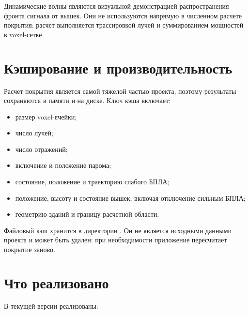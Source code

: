 \documentclass[12pt,a4paper]{article}
\begin{document}
Динамические волны являются визуальной демонстрацией распространения фронта сигнала от вышек. Они не используются напрямую в численном расчете покрытия: расчет выполняется трассировкой лучей и суммированием мощностей в voxel-сетке.

\section{Кэширование и производительность}

Расчет покрытия является самой тяжелой частью проекта, поэтому результаты сохраняются в памяти и на диске. Ключ кэша включает:

\begin{itemize}
    \item размер voxel-ячейки;
    \item число лучей;
    \item число отражений;
    \item включение и положение парома;
    \item состояние, положение и траекторию слабого БПЛА;
    \item положение, высоту и состояние вышек, включая отключение сильным БПЛА;
    \item геометрию зданий и границу расчетной области.
\end{itemize}

Файловый кэш хранится в директории . Он не является исходными данными проекта и может быть удален: при необходимости приложение пересчитает покрытие заново.

\section{Что реализовано}

В текущей версии реализованы:
\end{document}
